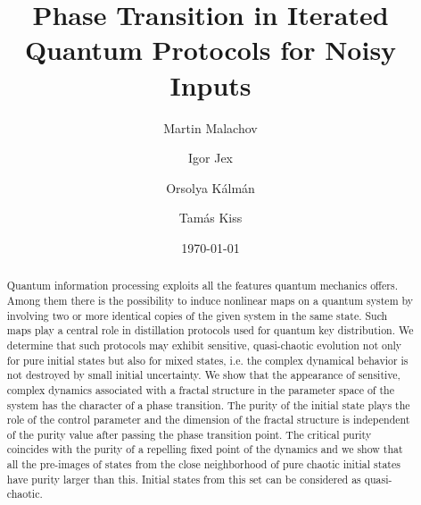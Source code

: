\documentclass[%
 aip,
 amsmath,amssymb,
 reprint,%
]{revtex4-1}
\begin{document}

\title[Phase Transition in Iterated Quantum Protocols for Noisy Inputs]{Phase Transition in Iterated Quantum Protocols for Noisy Inputs}

\author{Martin Malachov}
\author{Igor Jex}%
%

\author{Orsolya K\'alm\'an}
\author{Tam\'as Kiss}
%

\date{\today}%

\begin{abstract}
Quantum information processing exploits all the features quantum mechanics offers. Among them there is the possibility to induce nonlinear maps on a quantum system by involving two or more identical copies of the given system in the same state. Such maps play a central role in distillation protocols used for quantum key distribution. We determine that such protocols may exhibit sensitive, quasi-chaotic evolution not only for pure initial states but also for mixed states, i.e. the complex dynamical behavior is  not destroyed by small initial uncertainty. 
We show that the appearance of sensitive, complex dynamics associated with a fractal structure in the parameter space of the system has the character of a phase transition. The purity of the initial state plays the role of the control parameter and the dimension of the fractal structure is independent of the purity value after passing the phase transition point.
The critical purity coincides with the purity of a repelling fixed point of the dynamics and we show that all the pre-images of states from the close neighborhood of pure chaotic initial states have purity larger than this. Initial states from this set can be considered as quasi-chaotic.   
\end{abstract}
\end{document}

